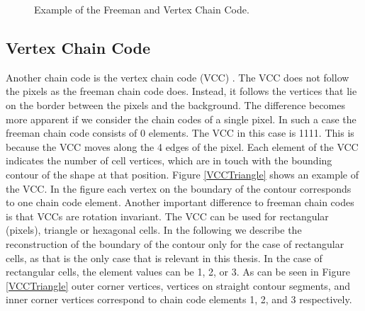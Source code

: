 \documentclass[thesis.tex]{subfiles}
\begin{document}
\begin{figure}
\centering
\begin{minipage}{\textwidth}
\end{minipage}
\caption{Example of the Freeman and Vertex Chain Code.}
 \label{fig:chainCodeExamples}
\end{figure}

\subsection{Vertex Chain Code}
\label{section:vertex_chain_code}
Another chain code is the vertex chain code (VCC) \cite{vertex_chain_code}. The VCC does not follow the pixels as the freeman chain code does. Instead, it follows the vertices that lie on the border between the pixels and the background. The difference becomes more apparent if we consider the chain codes of a single pixel. In such a case the freeman chain code consists of 0 elements. The VCC in this case is 1111. This is because the VCC moves along the 4 edges of the pixel. Each element of the VCC indicates the number of cell vertices, which are in touch with the bounding contour of the shape at that position. Figure \ref{VCCTriangle} shows an example of the VCC. In the figure each vertex on the boundary of the contour corresponds to one chain code element. Another important difference to freeman chain codes is that VCCs are rotation invariant. The VCC can be used for rectangular (pixels), triangle or hexagonal cells. In the following we describe the reconstruction of the boundary of the contour only for the case of rectangular cells, as that is the only case that is relevant in this thesis. In the case of rectangular cells, the element values can be 1, 2, or 3. As can be seen in Figure \ref{VCCTriangle} outer corner vertices, vertices on straight contour segments, and inner corner vertices correspond to chain code elements 1, 2, and 3 respectively. 
\end{document}
